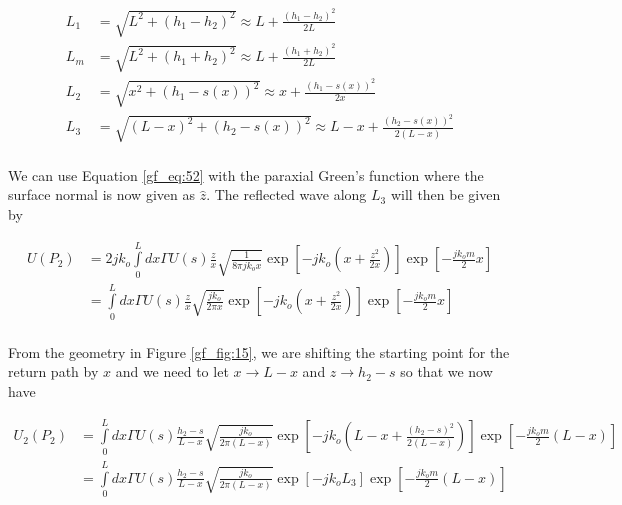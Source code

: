 \begin{equation}
\begin{aligned}
L_1 & = \sqrt{L^2 + (h_1-h_2)^2}  \approx L + \frac{(h_1 - h_2)^2}{2L}\\
L_m & = \sqrt{L^2 + (h_1+h_2)^2}  \approx L + \frac{(h_1 + h_2)^2}{2L}\\
L_2 &= \sqrt{x^2 + \left( h_1 - s(x)\right)^2}  \approx x + \frac{(h_1-s(x))^2}{2x}\\
L_3 & = \sqrt{\left(L - x\right)^2 + \left( h_2 - s(x)\right)^2}  \approx L-x + \frac{(h_2 - s(x))^2}{2\left(L-x\right)}\\
\end{aligned}
\label{gf_eq:59}
\end{equation}
\renewcommand{\baselinestretch}{2} \small\normalsize

We can use Equation \ref{gf_eq:52} with the paraxial Green's function where the surface normal is now given as $\hat{z}$. The reflected wave along $L_3$ will then be given by

\begin{equation}
\begin{aligned}
U(P_2) &= 2jk_o\int\limits_{0}^{L}dx\Gamma U(s)\frac{z}{x}\sqrt{\frac{1}{8\pi jk_o x}}\exp\left[-jk_o\left(x +\frac{z^2}{2x} \right) \right]\exp\left[-\frac{jk_om}{2}x\right] \\
&= \int\limits_{0}^{L}dx\Gamma U(s)\frac{z}{x}\sqrt{\frac{jk_o}{2\pi x}}\exp\left[-jk_o\left(x +\frac{z^2}{2x} \right) \right]\exp\left[-\frac{jk_om}{2}x\right] \\
\end{aligned}
\label{gf_eq:55}
\end{equation}
\renewcommand{\baselinestretch}{2} \small\normalsize

From the geometry in Figure \ref{gf_fig:15}, we are shifting the starting point for the return path by $x$ and we need to let $x \rightarrow L-x$ and $z \rightarrow h_2-s$ so that we now have

\begin{equation}
\begin{aligned}
U_2(P_2) &= \int\limits_{0}^{L}dx\Gamma U(s)\frac{h_2-s}{L-x}\sqrt{\frac{jk_o}{2\pi (L-x)}}\exp\left[-jk_o\left(L-x +\frac{(h_2-s)^2}{2(L-x)} \right) \right]\exp\left[-\frac{jk_om}{2}(L-x)\right] \\
&= \int\limits_{0}^{L}dx\Gamma U(s)\frac{h_2-s}{L-x}\sqrt{\frac{jk_o}{2\pi (L-x)}}\exp\left[-jk_oL_3\right]\exp\left[-\frac{jk_om}{2}(L-x)\right] \\
\end{aligned}
\label{gf_eq:56}
\end{equation}
\renewcommand{\baselinestretch}{2} \small\normalsize

